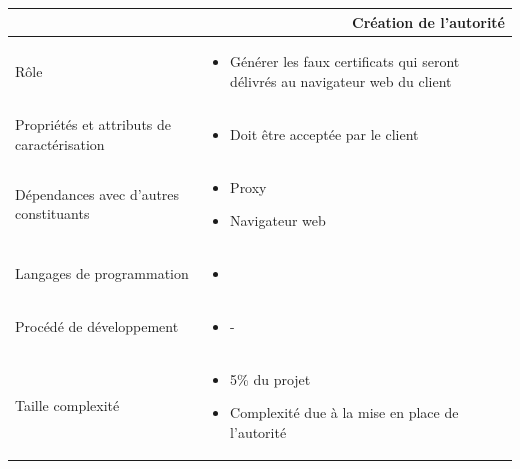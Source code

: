 \documentclass[a4paper,11pt,french]{article}
\begin{document}
\begin{center}
        \vspace*{0.7cm}
        \begin{tabularx}{16cm}{|l|X|}
        \hline
        \multicolumn{2}{|r|}{\textbf{Création de l'autorité}}\\
        \hline
        R\^ole &  \begin{itemize}\item Générer les faux certificats qui seront délivrés au navigateur web du client\end{itemize}\\
        \hline
        Propriétés et attributs de caractérisation & \begin{itemize} \item Doit \^etre acceptée par le client \end{itemize}\\
        \hline
        Dépendances avec d'autres constituants & \begin{itemize}\item Proxy \item Navigateur web \end{itemize}\\
        \hline
        Langages de programmation & \begin{itemize} \item  \end{itemize}\\
        \hline
        Procédé de développement & \begin{itemize}\item -\end{itemize}\\
        \hline
        Taille complexité & \begin{itemize}\item 5\% du projet \item Complexité due à la mise en place de l'autorité\end{itemize}\\
        \hline
        \end{tabularx}
\end{center}

\end{document}
